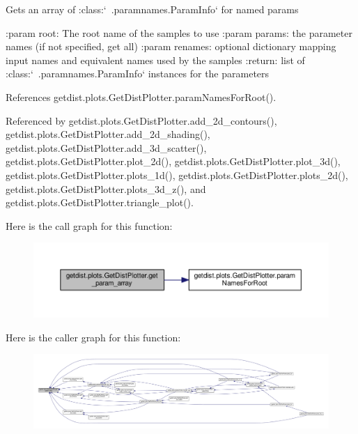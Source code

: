 \begin{DoxyVerb}Gets an array of :class:`~.paramnames.ParamInfo` for named params

:param root: The root name of the samples to use
:param params: the parameter names (if not specified, get all)
:param renames: optional dictionary mapping input names and equivalent names used by the samples
:return: list of :class:`~.paramnames.ParamInfo` instances for the parameters
\end{DoxyVerb}
 

References getdist.\+plots.\+Get\+Dist\+Plotter.\+param\+Names\+For\+Root().



Referenced by getdist.\+plots.\+Get\+Dist\+Plotter.\+add\+\_\+2d\+\_\+contours(), getdist.\+plots.\+Get\+Dist\+Plotter.\+add\+\_\+2d\+\_\+shading(), getdist.\+plots.\+Get\+Dist\+Plotter.\+add\+\_\+3d\+\_\+scatter(), getdist.\+plots.\+Get\+Dist\+Plotter.\+plot\+\_\+2d(), getdist.\+plots.\+Get\+Dist\+Plotter.\+plot\+\_\+3d(), getdist.\+plots.\+Get\+Dist\+Plotter.\+plots\+\_\+1d(), getdist.\+plots.\+Get\+Dist\+Plotter.\+plots\+\_\+2d(), getdist.\+plots.\+Get\+Dist\+Plotter.\+plots\+\_\+3d\+\_\+z(), and getdist.\+plots.\+Get\+Dist\+Plotter.\+triangle\+\_\+plot().

Here is the call graph for this function\+:
\nopagebreak
\begin{figure}[H]
\begin{center}
\leavevmode
\includegraphics[width=350pt]{classgetdist_1_1plots_1_1GetDistPlotter_a0b580d3d50c53c534fa8c1a6cefea4d0_cgraph}
\end{center}
\end{figure}
Here is the caller graph for this function\+:
\nopagebreak
\begin{figure}[H]
\begin{center}
\leavevmode
\includegraphics[width=350pt]{classgetdist_1_1plots_1_1GetDistPlotter_a0b580d3d50c53c534fa8c1a6cefea4d0_icgraph}
\end{center}
\end{figure}
\mbox{\label{classgetdist_1_1plots_1_1GetDistPlotter_a07ead3d7a1afc0b7b944292e92342084}} 
